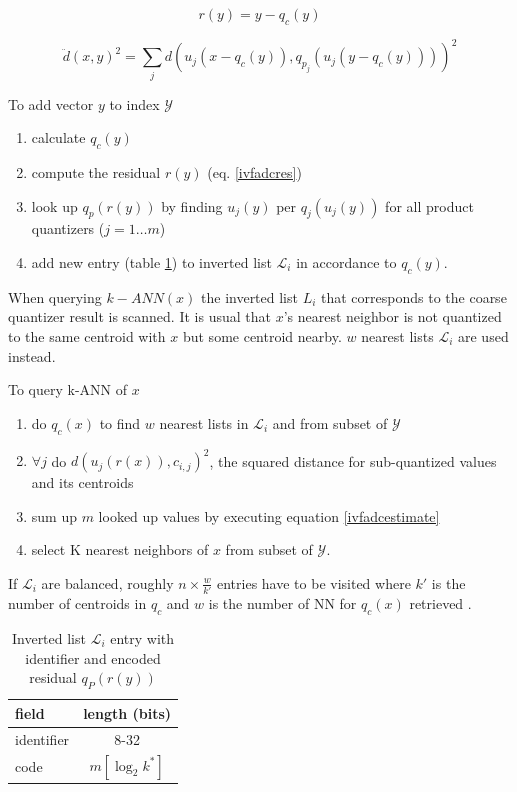 \documentclass[english,12pt,a4paper,pdftex,elec,utf8]{aaltothesis}
\begin{document}
\begin{equation}
  \label{ivfadcres}
r(y) = y - q_c(y)
\end{equation}

\begin{equation}
  \label{ivfadcestimate}
  \ddot{d}(x,y)^2 = \sum_jd\left(u_j(x-q_c(y)), q_{p_j}(u_j(y-q_c(y)))\right)^2
\end{equation}

To add vector $y$ to index $\mathcal{Y}$
\begin{enumerate}
\item calculate $q_c(y)$
\item compute the residual $r(y)$ (eq. \ref{ivfadcres})
\item look up $q_p(r(y))$ by finding $u_j(y)$ per $q_j(u_j(y))$ for all product quantizers ($j = 1 \ldots m$)
\item add new entry (table \ref{ivfadcentry}) to inverted list $\mathcal{L}_i$ in accordance to $q_c(y)$.
\end{enumerate}

When querying $k-ANN(x)$ the inverted list $L_i$ that corresponds to the coarse quantizer result is scanned. It is usual that $x$'s nearest neighbor is not quantized to the same centroid with $x$ but some centroid nearby. $w$ nearest lists $\mathcal{L}_i$ are used instead. \cite{Jegou2008}


To query k-ANN of $x$
\begin{enumerate}
\item do $q_c(x)$ to find $w$ nearest lists in $\mathcal{L}_i$ and from subset of $\mathcal{Y}$
\item $\forall j$ do $d(u_j(r(x)), c_{i,j})^2$, the squared distance for sub-quantized values and its centroids
\item sum up $m$ looked up values by executing equation \ref{ivfadcestimate}
  \item select K nearest neighbors of $x$ from subset of $\mathcal{Y}$.
\end{enumerate}
\cite{Jegou2008}

If $\mathcal{L}_i$ are balanced, roughly $n \times \frac{w}{k'}$ entries have to be visited where $k'$ is the number of centroids in $q_c$ and $w$ is the number of NN for $q_c(x)$ retrieved \cite{Jegou2008}.

\def\arraystretch{1.5}
\begin{table}[htb]
\caption{Inverted list $\mathcal{L}_i$ entry with identifier and encoded residual $q_P(r(y))$ \cite{Jegou2008}}
\label{ivfadcentry}
\begin{center}
\begin{tabular}{lc}
  field & length (bits)\\
  \hline
  identifier&8-32\\
  code & $m[\log_2k^*]$\\
\end{tabular}
\end{center}\end{table}
\end{document}
